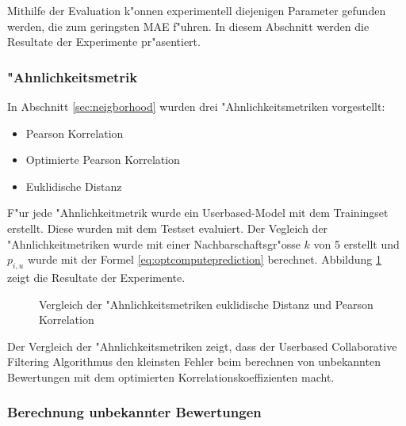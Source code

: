 \documentclass[a4paper, 12pt]{article}
\begin{document}
Mithilfe der Evaluation k"onnen experimentell diejenigen Parameter gefunden werden, die zum geringsten MAE f"uhren. In diesem Abschnitt werden die Resultate der Experimente pr"asentiert. 

\subsubsection{"Ahnlichkeitsmetrik}
\label{sec:simresults}

In Abschnitt \ref{sec:neigborhood} wurden drei "Ahnlichkeitsmetriken vorgestellt:

\begin{itemize}
\item Pearson Korrelation
\item Optimierte Pearson Korrelation
\item Euklidische Distanz
\end{itemize}

F"ur jede "Ahnlichkeitmetrik wurde ein Userbased-Model mit dem Trainingset erstellt. Diese wurden mit dem Testset evaluiert. Der Vegleich der "Ahnlichkeitmetriken wurde mit einer Nachbarschaftsgr"osse $k$ von 5 erstellt und $p_{i,u}$ wurde mit der Formel \ref{eq:optcomputeprediction} berechnet. Abbildung \ref{fig:comparesim} zeigt die Resultate der Experimente.

\begin{figure}
\centering
\label{fig:comparesim}
\caption{Vergleich der "Ahnlichkeitsmetriken euklidische Distanz und Pearson Korrelation}
\end{figure}

Der Vergleich der "Ahnlichkeitsmetriken zeigt, dass der Userbased Collaborative Filtering Algorithmus den kleinsten Fehler beim berechnen von unbekannten Bewertungen mit dem optimierten Korrelationskoeffizienten macht.

\subsubsection{Berechnung unbekannter Bewertungen}
\label{sec:eqpredictresults}
\end{document}
